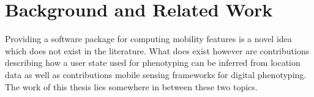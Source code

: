 \chapter{Background and Related Work}
\label{chapter:02}
Providing a software package for computing mobility features is a novel idea which does not exist in the literature. What does exist however are contributions describing how a user state used for phenotyping can be inferred from location data as well as contributions mobile sensing frameworks for digital phenotyping. The work of this thesis lies somewhere in between these two topics.





